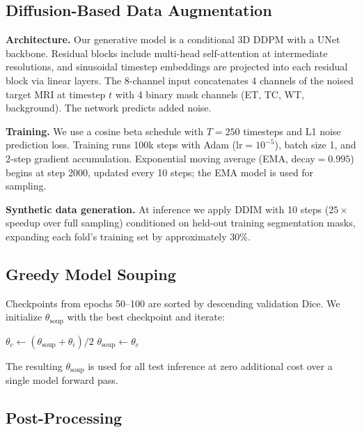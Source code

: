 \documentclass[conference]{IEEEtran}
\begin{document}
\subsection{Diffusion-Based Data Augmentation}

\textbf{Architecture.} Our generative model is a conditional 3D
DDPM with a UNet backbone. Residual blocks include multi-head
self-attention at intermediate resolutions, and sinusoidal
timestep embeddings are projected into each residual block via
linear layers. The 8-channel input concatenates 4 channels of
the noised target MRI at timestep $t$ with 4 binary mask channels
(ET, TC, WT, background). The network predicts added noise.

\textbf{Training.} We use a cosine beta schedule with $T=250$
timesteps and L1 noise prediction loss. Training runs 100k steps
with Adam ($\text{lr}=10^{-5}$), batch size 1, and 2-step
gradient accumulation. Exponential moving average (EMA,
decay$=0.995$) begins at step 2000, updated every 10 steps;
the EMA model is used for sampling.

\textbf{Synthetic data generation.} At inference we apply DDIM
\cite{b8} with 10 steps ($25{\times}$ speedup over full sampling)
conditioned on held-out training segmentation masks, expanding
each fold's training set by approximately 30\%.

\subsection{Greedy Model Souping}

Checkpoints from epochs 50--100 are sorted by descending
validation Dice. We initialize $\theta_{\text{soup}}$ with the
best checkpoint and iterate:

\begin{algorithmic}
  \STATE $\theta_c \leftarrow (\theta_{\text{soup}} + \theta_i) / 2$
    \STATE $\theta_{\text{soup}} \leftarrow \theta_c$
  \ENDIF
\ENDFOR
\end{algorithmic}

The resulting $\theta_{\text{soup}}$ is used for all test
inference at zero additional cost over a single model forward pass.

\subsection{Post-Processing}
\end{document}

